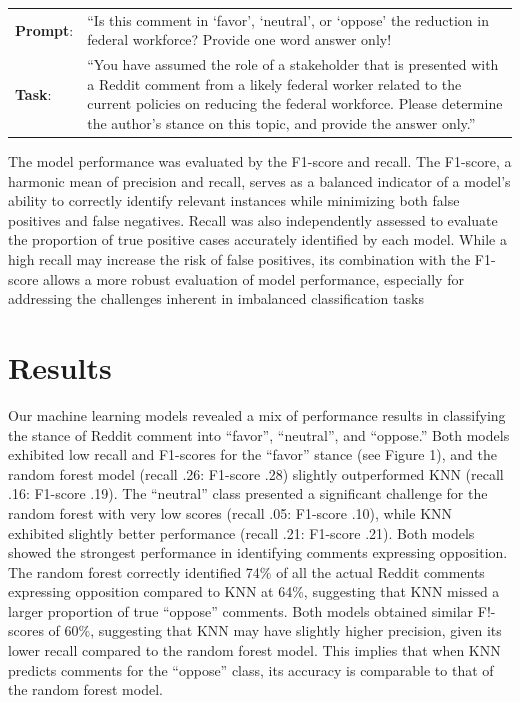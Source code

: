 \documentclass[
  12pt]{article}
\begin{document}
\begin{longtable}[]{@{}
  >{\raggedright\arraybackslash}p{}
  >{\raggedright\arraybackslash}p{}@{}}
\toprule\noalign{}
\endhead
\bottomrule\noalign{}
\endlastfoot
\textbf{Prompt}: & ``Is this comment in `favor', `neutral', or `oppose'
the reduction in federal workforce? Provide one word answer only! \\
\textbf{Task}: & ``You have assumed the role of a stakeholder that is
presented with a Reddit comment from a likely federal worker related to
the current policies on reducing the federal workforce. Please determine
the author's stance on this topic, and provide the answer only.'' \\
\end{longtable}

The model performance was evaluated by the F1-score and recall. The
F1-score, a harmonic mean of precision and recall, serves as a balanced
indicator of a model's ability to correctly identify relevant instances
while minimizing both false positives and false negatives. Recall was
also independently assessed to evaluate the proportion of true positive
cases accurately identified by each model. While a high recall may
increase the risk of false positives, its combination with the F1-score
allows a more robust evaluation of model performance, especially for
addressing the challenges inherent in imbalanced classification tasks

\section{Results}\label{results}

Our machine learning models revealed a mix of performance results in
classifying the stance of Reddit comment into ``favor'', ``neutral'',
and ``oppose.'' Both models exhibited low recall and F1-scores for the
``favor'' stance (see Figure 1), and the random forest model (recall
.26: F1-score .28) slightly outperformed KNN (recall .16: F1-score .19).
The ``neutral'' class presented a significant challenge for the random
forest with very low scores (recall .05: F1-score .10), while KNN
exhibited slightly better performance (recall .21: F1-score .21). Both
models showed the strongest performance in identifying comments
expressing opposition. The random forest correctly identified 74\% of
all the actual Reddit comments expressing opposition compared to KNN at
64\%, suggesting that KNN missed a larger proportion of true ``oppose''
comments. Both models obtained similar F!- scores of 60\%, suggesting
that KNN may have slightly higher precision, given its lower recall
compared to the random forest model. This implies that when KNN predicts
comments for the ``oppose'' class, its accuracy is comparable to that of
the random forest model.
\end{document}
